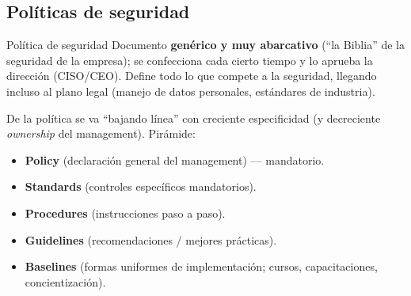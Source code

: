 \documentclass[../main.tex]{subfiles}
\begin{document}
\subsection{Políticas de seguridad}

\begin{definicion}{Política de seguridad}
Documento \textbf{genérico y muy abarcativo} (``la Biblia'' de la seguridad de
la empresa); se confecciona cada cierto tiempo y lo aprueba la dirección
(CISO/CEO). Define todo lo que compete a la seguridad, llegando incluso al plano
legal (manejo de datos personales, estándares de industria).
\end{definicion}

De la política se va ``bajando línea'' con creciente especificidad (y decreciente
\emph{ownership} del management). Pirámide:
\begin{itemize}
  \item \textbf{Policy} (declaración general del management) --- mandatorio.
  \item \textbf{Standards} (controles específicos mandatorios).
  \item \textbf{Procedures} (instrucciones paso a paso).
  \item \textbf{Guidelines} (recomendaciones / mejores prácticas).
  \item \textbf{Baselines} (formas uniformes de implementación; cursos,
    capacitaciones, concientización).
\end{itemize}
\end{document}

